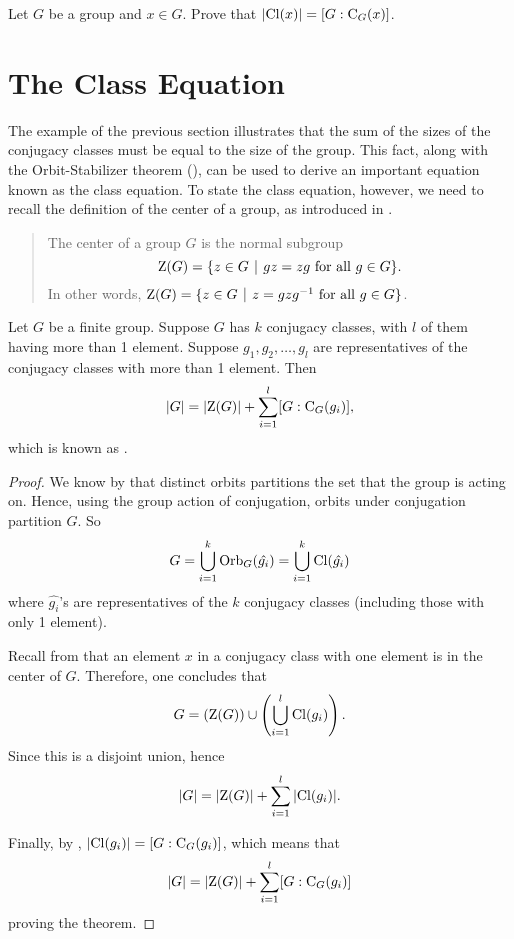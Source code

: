\begin{exercise}\label{exercise-cardinality-of-conjugacy-class}
    Let $G$ be a group and $x \in G$. Prove that $|\mathrm{Cl}(x)| = [G : \mathrm{C}_{G}(x)]$.
\end{exercise}

\section{The Class Equation}
The example of the previous section illustrates that the sum of the sizes of the conjugacy classes must be equal to the size of the group. This fact, along with the Orbit-Stabilizer theorem (), can be used to derive an important equation known as the class equation. To state the class equation, however, we need to recall the definition of the center of a group, as introduced in .
\begin{quote}
    The center of a group $G$ is the normal subgroup
    \[
        \CenterGrp{G} = \{z \in G \vert gz = zg \text{ for all } g \in G\}.
    \]
    In other words, $\CenterGrp{G} = \{z \in G \vert z = gzg^{-1} \text{ for all } g \in G\}$.
\end{quote}

\begin{theorem}\label{thrm-class-equation}
    Let $G$ be a finite group. Suppose $G$ has $k$ conjugacy classes, with $l$ of them having more than 1 element. Suppose $g_1, g_2, \dots, g_l$ are representatives of the conjugacy classes with more than 1 element. Then
    \[
        |G| = |\mathrm{Z}(G)| + \sum_{i=1}^l [G : \mathrm{C}_{G}(g_i)],
    \]
    which is known as .
\end{theorem}

\begin{proof}
    We know by  that distinct orbits partitions the set that the group is acting on. Hence, using the group action of conjugation, orbits under conjugation partition $G$. So
    \[
        G = \bigcup_{i=1}^k \mathrm{Orb}_{G}(\hat{g_i}) = \bigcup_{i=1}^k \mathrm{Cl}(\hat{g_i})
    \]
    where $\hat{g_i}$'s are representatives of the $k$ conjugacy classes (including those with only 1 element).

    Recall from  that an element $x$ in a conjugacy class with one element is in the center of $G$. Therefore, one concludes that
    \[
        G = \left(\mathrm{Z}(G)\right) \cup \left(\bigcup_{i=1}^l \mathrm{Cl}(g_i)\right).
    \]
    Since this is a disjoint union, hence
    \[
        |G| = |\mathrm{Z}(G)| + \sum_{i=1}^l |\mathrm{Cl}(g_i)|.
    \]

    Finally, by , $|\mathrm{Cl}(g_i)| = [G : \mathrm{C}_{G}(g_i)]$, which means that
    \[
        |G| = |\mathrm{Z}(G)| + \sum_{i=1}^l [G:\mathrm{C}_{G}(g_i)]
    \]
    proving the theorem.
\end{proof}

